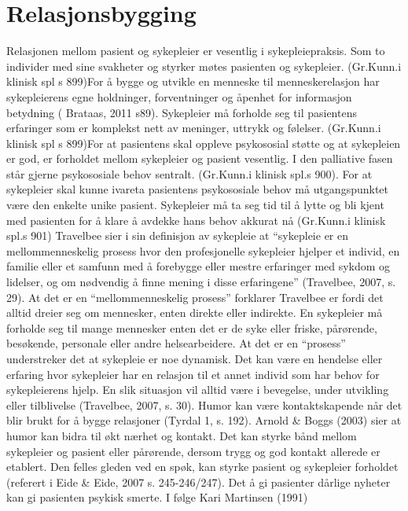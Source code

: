 \section{Relasjonsbygging}

Relasjonen mellom pasient og sykepleier er vesentlig i sykepleiepraksis. Som to
individer med sine svakheter og styrker møtes pasienten og sykepleier.
(Gr.Kunn.i klinisk spl s 899)For å bygge og utvikle en menneske til
menneskerelasjon har sykepleierens egne holdninger, forventninger og åpenhet
for informasjon betydning ( Brataas, 2011 s89). Sykepleier må forholde seg til
pasientens erfaringer som er komplekst nett av meninger, uttrykk og følelser.
(Gr.Kunn.i klinisk spl s 899)For at pasientens skal oppleve psykososial støtte
og at sykepleien er god, er forholdet mellom sykepleier og pasient vesentlig. I
den palliative fasen står gjerne psykososiale behov sentralt. (Gr.Kunn.i
klinisk spl.s 900). For at sykepleier skal kunne ivareta pasientens
psykososiale behov må utgangspunktet være den enkelte unike pasient. Sykepleier
må ta seg tid til å lytte og bli kjent med pasienten for å klare å avdekke hans
behov akkurat nå (Gr.Kunn.i klinisk spl.s 901) Travelbee sier i sin definisjon
av sykepleie at “sykepleie er en mellommenneskelig prosess hvor den
profesjonelle sykepleier hjelper et individ, en familie eller et samfunn med å
forebygge eller mestre erfaringer med sykdom og lidelser, og om nødvendig å
finne mening i disse erfaringene” (Travelbee, 2007, s. 29). At det er en
“mellommenneskelig prosess” forklarer Travelbee er fordi det alltid dreier seg
om mennesker, enten direkte eller indirekte. En sykepleier må forholde seg til
mange mennesker enten det er de syke eller friske, pårørende, besøkende,
personale eller andre helsearbeidere.  At det er en “prosess” understreker det
at sykepleie er noe dynamisk. Det kan være en hendelse eller erfaring hvor
sykepleier har en relasjon til et annet individ som har behov for sykepleierens
hjelp. En slik situasjon vil alltid være i bevegelse, under utvikling eller
tilblivelse (Travelbee, 2007, s. 30).  Humor kan være kontaktskapende når det
blir brukt for å bygge relasjoner (Tyrdal 1, s. 192).  Arnold \&{} Boggs (2003)
sier at humor kan bidra til økt nærhet og kontakt. Det kan styrke bånd mellom
sykepleier og pasient eller pårørende, dersom trygg og god kontakt allerede er
etablert. Den felles gleden ved en spøk, kan styrke pasient og sykepleier
forholdet (referert i Eide \&{} Eide, 2007 s. 245-246/247). Det å gi pasienter
dårlige nyheter kan gi pasienten psykisk smerte. I følge Kari Martinsen (1991)
